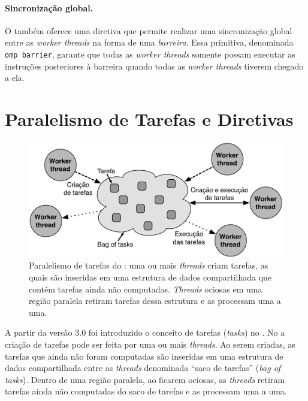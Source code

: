 \documentclass{SBCbookchapter}
\begin{document}
		\paragraph{Sincronização global.} O \openmp também oferece uma
		diretiva que permite realizar uma sincronização global entre as
		\textit{worker threads} na forma de uma \textit{barreira}. Essa
		primitiva, denominada \texttt{omp barrier}, garante que todas as
		\textit{worker threads} somente possam executar as instruções
		posteriores à barreira quando todas as \textit{worker threads}
		tiverem chegado a ela.
	
\section{Paralelismo de Tarefas e Diretivas \openmp}
\label{sec:paralelismo tarefas}

	\begin{figure}[b]
		\centering
		\includegraphics[width=0.6\linewidth]{img/tasks}
		\caption{Paralelismo de tarefas do \openmp: uma ou mais \textit{threads} criam
		tarefas, as quais são inseridas em uma estrutura de dados compartilhada
		que contém tarefas ainda não computadas. \textit{Threads} ociosas em
		uma região paralela retiram tarefas dessa estrutura e as processam uma a
		uma.}
		\label{fig:tasks}
	\end{figure}

	A partir da versão 3.0 foi introduzido o conceito de tarefas
	(\textit{tasks}) no \openmp.  No \openmp a criação de tarefas pode
	ser feita por uma ou mais \textit{threads}. Ao serem criadas, as
	tarefas que ainda não foram computadas são inseridas em uma
	estrutura de dados compartilhada entre as \textit{threads}
	denominada ``saco de tarefas'' (\textit{bag of tasks}). Dentro de
	uma região paralela, ao ficarem ociosas, as \textit{threads} retiram
	tarefas ainda não computadas do saco de tarefas e as processam uma a
	uma.
\end{document}

